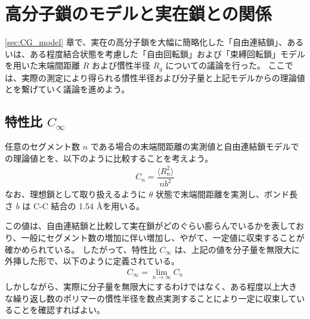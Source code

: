 \documentclass[a4paper,11pt]{ltjsarticle}
\begin{document}


\newpage

\section{高分子鎖のモデルと実在鎖との関係}

\ref{sec:CG_model} 章で、実在の高分子鎖を大幅に簡略化した「自由連結鎖」、あるいは、ある程度結合状態を考慮した「自由回転鎖」および「束縛回転鎖」モデルを用いた末端間距離 $R$ および慣性半径 $R_g$ についての議論を行った。
ここでは、実際の測定により得られる慣性半径および分子量と上記モデルからの理論値とを繋げていく議論を進めよう。


\subsection{特性比 $C_{\infty}$}

任意のセグメント数 $n$ である場合の末端間距離の実測値と自由連結鎖モデルでの理論値とを、以下のように比較することを考えよう。
\begin{align}
C_n=\dfrac{ \langle R_n^2 \rangle }{n b^2}
\end{align}
なお、理想鎖として取り扱えるように $\theta$ 状態で末端間距離を実測し、ボンド長さ $b$ は C-C 結合の 1.54 \AA を用いる。

この値は、自由連結鎖と比較して実在鎖がどのぐらい膨らんでいるかを表しており、一般にセグメント数の増加に伴い増加し、やがて、一定値に収束することが確かめられている。
したがって、特性比 $C_{\infty}$ は、上記の値を分子量を無限大に外挿した形で、以下のように定義されている。
\begin{align}
C_{\infty}=\lim_{n \to \infty} C_n 
\label{fig:CR}
\end{align}
しかしながら、実際に分子量を無限大にするわけではなく、ある程度以上大きな繰り返し数のポリマーの慣性半径を数点実測することにより一定に収束していることを確認すればよい。
\end{document}
